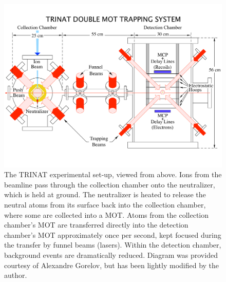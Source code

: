 \begin{figure}[t!h]
	\centering
	\includegraphics[width=.999\linewidth]
	{Figures/DoubleMot5.pdf}
	\caption[The TRINAT experimental set-up, viewed from above]{The TRINAT experimental set-up, viewed from above.  Ions from the beamline pass through the collection chamber onto the neutralizer, which is held at ground.  The neutralizer is heated to release the neutral atoms from its surface back into the collection chamber, where some are collected into a \ac{MOT}.  Atoms from the collection chamber's MOT are transferred directly into the detection chamber's MOT approximately once per second, kept focused during the transfer by funnel beams (lasers).  Within the detection chamber, background events are dramatically reduced.  Diagram was provided courtesy of Alexandre Gorelov, but has been lightly modified by the author. }
	\label{fig:doublemot}
\end{figure}

